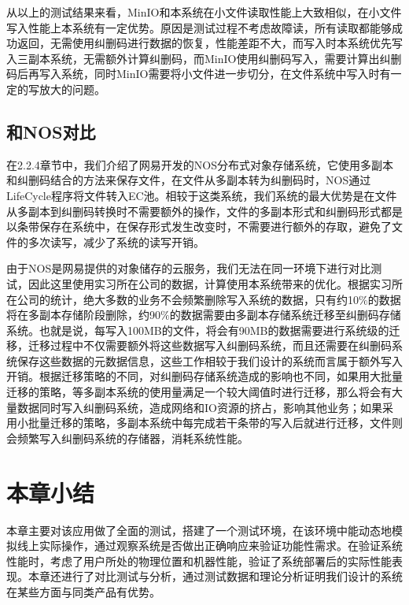 从以上的测试结果来看，MinIO和本系统在小文件读取性能上大致相似，在小文件写入性能上本系统有一定优势。原因是测试过程不考虑故障读，所有读取都能够成功返回，无需使用纠删码进行数据的恢复，性能差距不大，而写入时本系统优先写入三副本系统，无需额外计算纠删码，而MinIO使用纠删码写入，需要计算出纠删码后再写入系统，同时MinIO需要将小文件进一步切分，在文件系统中写入时有一定的写放大的问题。

\subsection{和NOS对比}%
在2.2.4章节中，我们介绍了网易开发的NOS分布式对象存储系统，它使用多副本和纠删码结合的方法来保存文件，在文件从多副本转为纠删码时，NOS通过LifeCycle程序将文件转入EC池。相较于这类系统，我们系统的最大优势是在文件从多副本到纠删码转换时不需要额外的操作，文件的多副本形式和纠删码形式都是以条带保存在系统中，在保存形式发生改变时，不需要进行额外的存取，避免了文件的多次读写，减少了系统的读写开销。

由于NOS是网易提供的对象储存的云服务，我们无法在同一环境下进行对比测试，因此这里使用实习所在公司的数据，计算使用本系统带来的优化。根据实习所在公司的统计，绝大多数的业务不会频繁删除写入系统的数据，只有约10$\%$的数据将在多副本存储阶段删除，约90$\%$的数据需要由多副本存储系统迁移至纠删码存储系统。也就是说，每写入100MB的文件，将会有90MB的数据需要进行系统级的迁移，迁移过程中不仅需要额外将这些数据写入纠删码系统，而且还需要在纠删码系统保存这些数据的元数据信息，这些工作相较于我们设计的系统而言属于额外写入开销。根据迁移策略的不同，对纠删码存储系统造成的影响也不同，如果用大批量迁移的策略，等多副本系统的使用量满足一个较大阈值时进行迁移，那么将会有大量数据同时写入纠删码系统，造成网络和IO资源的挤占，影响其他业务；如果采用小批量迁移的策略，多副本系统中每完成若干条带的写入后就进行迁移，文件则会频繁写入纠删码系统的存储器，消耗系统性能。

\section{本章小结}%
本章主要对该应用做了全面的测试，搭建了一个测试环境，在该环境中能动态地模拟线上实际操作，通过观察系统是否做出正确响应来验证功能性需求。在验证系统性能时，考虑了用户所处的物理位置和机器性能，验证了系统部署后的实际性能表现。本章还进行了对比测试与分析，通过测试数据和理论分析证明我们设计的系统在某些方面与同类产品有优势。
